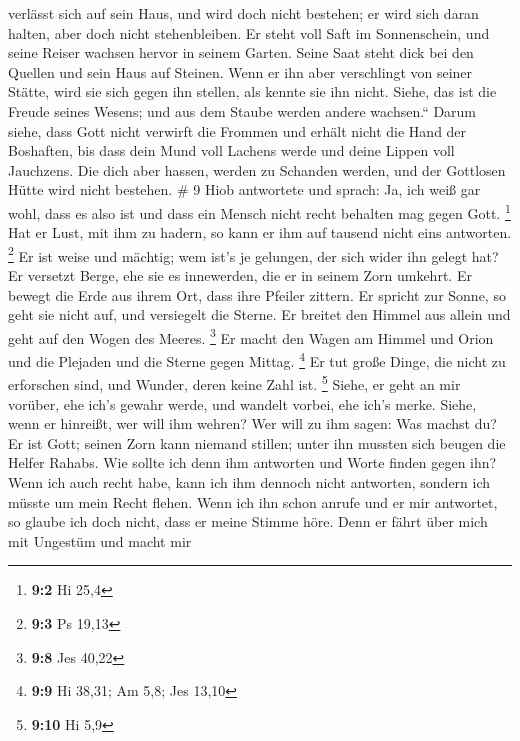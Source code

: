 verlässt sich auf sein Haus, und wird doch nicht bestehen; er wird sich
daran halten, aber doch nicht stehenbleiben.  Er steht
voll Saft im Sonnenschein, und seine Reiser wachsen hervor in seinem
Garten.  Seine Saat steht dick bei den Quellen und sein
Haus auf Steinen.  Wenn er ihn aber verschlingt von
seiner Stätte, wird sie sich gegen ihn stellen, als kennte sie ihn
nicht.  Siehe, das ist die Freude seines Wesens; und aus
dem Staube werden andere wachsen.``  Darum siehe, dass
Gott nicht verwirft die Frommen und erhält nicht die Hand der Boshaften,
 bis dass dein Mund voll Lachens werde und deine Lippen
voll Jauchzens.  Die dich aber hassen, werden zu Schanden
werden, und der Gottlosen Hütte wird nicht bestehen. \# 9 
Hiob antwortete und sprach:  Ja, ich weiß gar wohl, dass
es also ist und dass ein Mensch nicht recht behalten mag gegen Gott.
\footnote{\textbf{9:2} Hi 25,4}  Hat er Lust, mit ihm zu
hadern, so kann er ihm auf tausend nicht eins antworten. \footnote{\textbf{9:3}
  Ps 19,13}  Er ist weise und mächtig; wem ist's je
gelungen, der sich wider ihn gelegt hat?  Er versetzt
Berge, ehe sie es innewerden, die er in seinem Zorn umkehrt.
 Er bewegt die Erde aus ihrem Ort, dass ihre Pfeiler
zittern.  Er spricht zur Sonne, so geht sie nicht auf, und
versiegelt die Sterne.  Er breitet den Himmel aus allein
und geht auf den Wogen des Meeres. \footnote{\textbf{9:8} Jes 40,22}
 Er macht den Wagen am Himmel und Orion und die Plejaden
und die Sterne gegen Mittag. \footnote{\textbf{9:9} Hi 38,31; Am 5,8;
  Jes 13,10}  Er tut große Dinge, die nicht zu erforschen
sind, und Wunder, deren keine Zahl ist. \footnote{\textbf{9:10} Hi 5,9}
 Siehe, er geht an mir vorüber, ehe ich's gewahr werde,
und wandelt vorbei, ehe ich's merke.  Siehe, wenn er
hinreißt, wer will ihm wehren? Wer will zu ihm sagen: Was machst du?
 Er ist Gott; seinen Zorn kann niemand stillen; unter ihn
mussten sich beugen die Helfer Rahabs.  Wie sollte ich
denn ihm antworten und Worte finden gegen ihn?  Wenn ich
auch recht habe, kann ich ihm dennoch nicht antworten, sondern ich
müsste um mein Recht flehen.  Wenn ich ihn schon anrufe
und er mir antwortet, so glaube ich doch nicht, dass er meine Stimme
höre.  Denn er fährt über mich mit Ungestüm und macht mir
